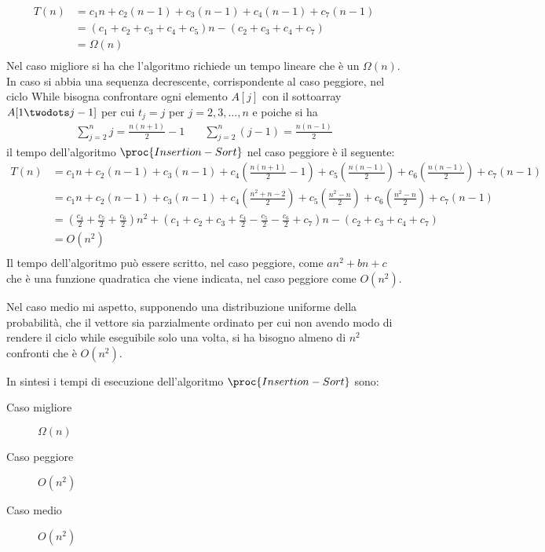 \begin{align*}
    T(n) & = c_1n + c_2(n-1) + c_3(n-1) + c_4(n-1) + c_7(n-1) \\
         & = (c_1 + c_2 + c_3 + c_4 + c_5)n - (c_2 + c_3+ c_4+ c_7) \\
         & = \Omega(n) \\
\end{align*}
Nel caso migliore si ha che l'algoritmo richiede un tempo lineare che è un $\Omega(n)$.\newline
In caso si abbia una sequenza decrescente, corrispondente al caso peggiore, nel ciclo While bisogna
confrontare ogni elemento $A[j]$ con il sottoarray $A[1 \twodots j-1]$ per cui $t_j = j$
per $j=2,3,\dots,n$ e poiche si ha
\begin{align*}
    \sum _{j=2} ^ n j = \frac{n(n+1)}{2} -1 & \quad \sum_{j=2}^n (j-1) = \frac{n(n-1)}{2}
\end{align*}
il tempo dell'algoritmo $\proc{Insertion-Sort}$ nel caso peggiore è il seguente:
\begin{align*}
    T(n) & = c_1n + c_2(n-1) + c_3(n-1) + c_4 (\frac{n(n+1)}{2} -1) + c_5 (\frac{n(n-1)}{2})
         + c_6 (\frac{n(n-1)}{2}) + c_7(n-1) \\
         & = c_1n + c_2(n-1) + c_3(n-1) + c_4(\frac{n^2+n-2}{2}) + c_5(\frac{n^2-n}{2})
           + c_6(\frac{n^2-n}{2}) + c_7(n-1) \\
         & = (\frac{c_4}{2} +\frac{c_5}{2} + \frac{c_6}{2})n^2 + (c_1+c_2+c_3+\frac{c_4}{2} - \frac{c_5}{2}
            -\frac{c_6}{2}+c_7)n -(c_2+c_3+c_4+c_7)\\
         & = O(n^2)\\
\end{align*}
Il tempo dell'algoritmo può essere scritto, nel caso peggiore, come $an^2 + bn + c$ che è una funzione
quadratica che viene indicata, nel caso peggiore come $O(n^2)$.

Nel caso medio mi aspetto, supponendo una distribuzione uniforme della probabilità,
che il vettore sia parzialmente ordinato per cui non avendo modo di rendere il ciclo
while eseguibile solo una volta, si ha bisogno almeno di $n^2$ confronti che è $O(n^2)$.

In sintesi i tempi di esecuzione dell'algoritmo $\proc{Insertion-Sort}$ sono:
\begin{description}
  \item[Caso migliore] $\Omega(n)$
  \item[Caso peggiore] $O(n^2)$
  \item[Caso medio] $O(n^2)$
\end{description}
